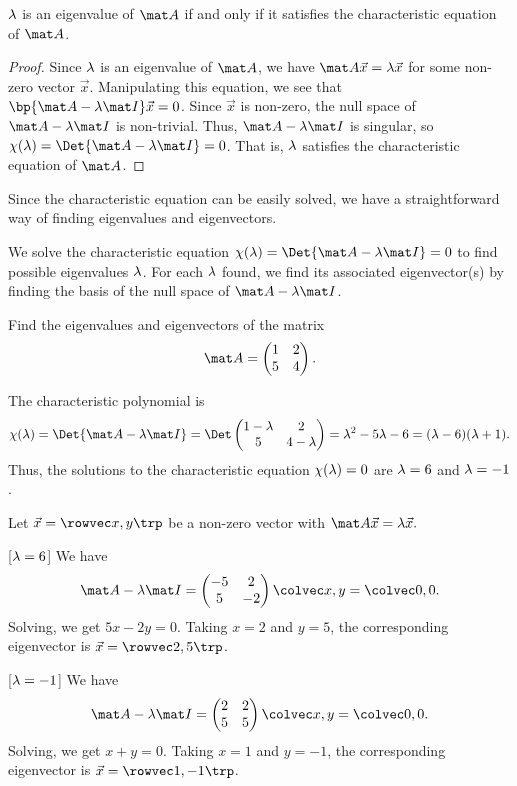\begin{proposition}
    $\lambda$ is an eigenvalue of $\mat A$ if and only if it satisfies the characteristic equation of $\mat A$.
\end{proposition}
\begin{proof}
    Since $\lambda$ is an eigenvalue of $\mat A$, we have $\mat A \vec x = \l \vec x$ for some non-zero vector $\vec x$. Manipulating this equation, we see that $\bp{\mat A - \l \mat I} \vec x = 0$. Since $\vec x$ is non-zero, the null space of $\mat A - \l \mat I$ is non-trivial. Thus, $\mat A - \l \mat I$ is singular, so $\c(\l) = \Det{\mat A - \l \mat I} = 0$.  That is, $\lambda$ satisfies the characteristic equation of $\mat A$.
\end{proof}

Since the characteristic equation can be easily solved, we have a straightforward way of finding eigenvalues and eigenvectors.

\begin{recipe}
    We solve the characteristic equation $\c(\l) = \Det{\mat A - \l \mat I} = 0$ to find possible eigenvalues $\lambda$. For each $\lambda$ found, we find its associated eigenvector(s) by finding the basis of the null space of $\mat A - \l \mat I$.
\end{recipe}

\begin{sample}
    Find the eigenvalues and eigenvectors of the matrix \[\mat A = \begin{pmatrix}1 & 2 \\ 5 & 4\end{pmatrix}.\]
\end{sample}
\begin{sample}
    The characteristic polynomial is \[\c(\l) = \Det{\mat A - \l \mat I} = \Det \begin{pmatrix}1 - \l & 2 \\ 5 & 4-\l\end{pmatrix} = \l^2 - 5\l -6 = (\l - 6)(\l + 1).\] Thus, the solutions to the characteristic equation $\chi(\lambda) = 0$ are $\lambda = 6$ and $\lambda = -1$.

    Let $\vec x = \cveciix{x}{y}$ be a non-zero vector with $\mat A \vec x = \l \vec x.$

    [$\lambda = 6$] We have \[\mat A - \l \mat I = \begin{pmatrix}-5 & 2 \\ 5 & -2\end{pmatrix} \cvecii{x}{y} = \cvecii00.\] Solving, we get $5x - 2y = 0$. Taking $x = 2$ and $y = 5$, the corresponding eigenvector is $\vec x = \cveciix{2}{5}$.

    [$\lambda = -1$] We have \[\mat A- \l \mat I = \begin{pmatrix}2 & 2 \\ 5 & 5\end{pmatrix} \cvecii{x}{y} = \cvecii00.\] Solving, we get $x + y = 0$. Taking $x = 1$ and $y = -1$, the corresponding eigenvector is $\vec x = \cveciix1{-1}$.
\end{sample}


